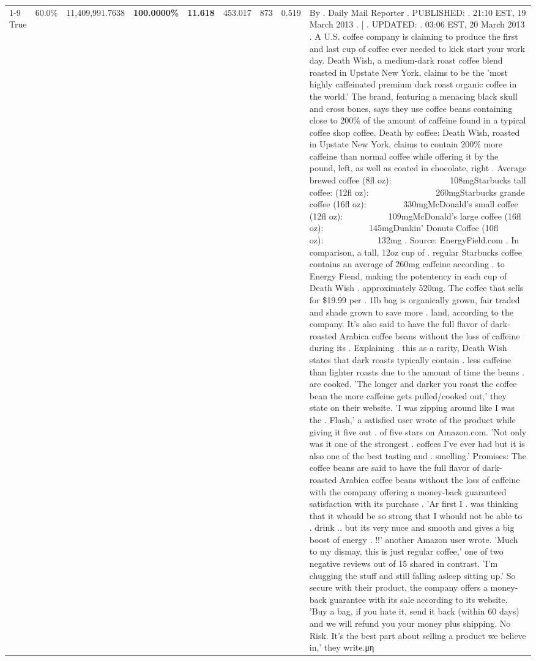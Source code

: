 \begin{table}[H]
{\begin{tabular}{lllrlllll}
\cline{1-9}
True & 60.0\% & 11,409,991.7638 & \bfseries \color{red} 100.0000\% & \bfseries \color{red} 11.618 & 453.017 & 873 & 0.519 & By . Daily Mail Reporter . PUBLISHED: . 21:10 EST, 19 March 2013 . | . UPDATED: . 03:06 EST, 20 March 2013 . A U.S. coffee company is claiming to produce the first and last cup of coffee ever needed to kick start your work day. Death Wish, a medium-dark roast coffee blend roasted in Upstate New York, claims to be the 'most highly caffeinated premium dark roast organic coffee in the world.' The brand, featuring a menacing black skull and cross bones, says they use coffee beans containing close to 200\% of the amount of caffeine found in a typical coffee shop coffee. Death by coffee: Death Wish, roasted in Upstate New York, claims to contain 200\% more caffeine than normal coffee while offering it by the pound, left, as well as coated in chocolate, right . Average brewed coffee (8fl oz):              108mgStarbucks tall coffee: (12fl oz):                260mgStarbucks grande coffee (16fl oz):         330mgMcDonald's small coffee (12fl oz):           109mgMcDonald's large coffee (16fl oz):           145mgDunkin' Donuts Coffee (10fl oz):             132mg . Source: EnergyField.com . In comparison, a tall, 12oz cup of . regular Starbucks coffee contains an average of 260mg caffeine according . to Energy Fiend, making the potentency in each cup of Death Wish . approximately 520mg. The coffee that sells for \$19.99 per . 1lb bag is organically grown, fair traded and shade grown to save more . land, according to the company. It's also said to have the full flavor of dark-roasted Arabica coffee beans without the loss of caffeine during its . Explaining . this as a rarity, Death Wish states that dark roasts typically contain . less caffeine than lighter roasts due to the amount of time the beans . are cooked. 'The longer and darker you roast the coffee bean the more caffeine gets pulled/cooked out,' they state on their website. 'I was zipping around like I was the . Flash,' a satisfied user wrote of the product while giving it five out . of five stars on Amazon.com. 'Not only was it one of the strongest . coffees I've ever had but it is also one of the best tasting and . smelling.’ Promises: The coffee beans are said to have the full flavor of dark-roasted Arabica coffee beans without the loss of caffeine with the company offering a money-back guaranteed satisfaction with its purchase . 'Ar first I . was thinking that it whould be so strong that I whould not be able to . drink .. but its very nuce and smooth and gives a big boost of energy . !!' another Amazon user wrote. 'Much to my dismay, this is just regular coffee,' one of two negative reviews out of 15 shared in contrast. 'I'm chugging the stuff and still falling asleep sitting up.' So secure with their product, the company offers a money-back guarantee with its sale according to its website. 'Buy a bag, if you hate it, send it back (within 60 days) and we will refund you your money plus shipping. No Risk. It’s the best part about selling a product we believe in,' they write.μη \\

\end{tabular}}
\end{table}
